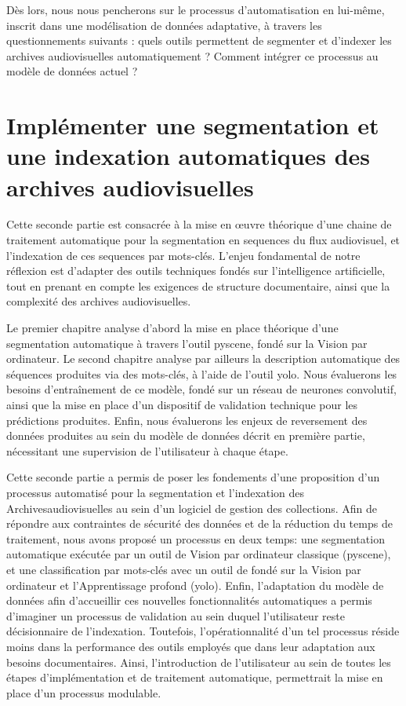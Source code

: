 \documentclass[12pt,twoside]{book}
\begin{document}
Dès lors, nous nous pencherons sur le processus d'automatisation en lui-même, inscrit dans une modélisation de données adaptative, à travers les questionnements suivants : quels outils permettent de segmenter et d'indexer les archives audiovisuelles automatiquement ? Comment intégrer ce processus au modèle de données actuel ? 
	
\part{Implémenter une segmentation et une indexation automatiques des archives audiovisuelles}

Cette seconde partie est consacrée à la mise en œuvre théorique d'une chaine de traitement automatique pour la segmentation en \gls{sequence}s du flux audiovisuel, et l'indexation de ces \gls{sequence}s par mots-clés. L'enjeu fondamental de notre réflexion est d'adapter des outils techniques fondés sur l'intelligence artificielle, tout en prenant en compte les exigences de structure documentaire, ainsi que la complexité des archives audiovisuelles.

Le premier chapitre analyse d'abord la mise en place théorique d'une segmentation automatique à travers l'outil \gls{pyscene}, fondé sur la \gls{Vision par ordinateur}. 
Le second chapitre analyse par ailleurs la description automatique des séquences produites via des mots-clés, à l'aide de l'outil \gls{yolo}. Nous évaluerons les besoins d'entraînement de ce modèle, fondé sur un réseau de neurones convolutif, ainsi que la mise en place d'un dispositif de validation technique pour les prédictions produites. 
Enfin, nous évaluerons les enjeux de reversement des données produites au sein du modèle de données décrit en première partie, nécessitant une supervision de l'utilisateur à chaque étape. 





 



Cette seconde partie a permis de poser les fondements d'une proposition d'un processus automatisé pour la segmentation et l'indexation des \gls{Archivesaudiovisuelles} au sein d'un logiciel de gestion des collections. Afin de répondre aux contraintes de sécurité des données et de la réduction du temps de traitement, nous avons proposé un processus en deux temps: une segmentation automatique exécutée par un outil de \gls{Vision par ordinateur} classique (\gls{pyscene}), et une classification par mots-clés avec un outil de fondé sur la \gls{Vision par ordinateur} et l'\gls{Apprentissage profond} (\gls{yolo}). Enfin, l'adaptation du modèle de données afin d'accueillir ces nouvelles fonctionnalités automatiques a permis d'imaginer un processus de validation au sein duquel l'utilisateur reste décisionnaire de l'indexation. 
Toutefois, l'opérationnalité d'un tel processus réside moins dans la performance des outils employés que dans leur adaptation aux besoins documentaires. Ainsi, l'introduction de l'utilisateur au sein de toutes les étapes d'implémentation et de traitement automatique, permettrait la mise en place d'un processus modulable. 
\end{document}
